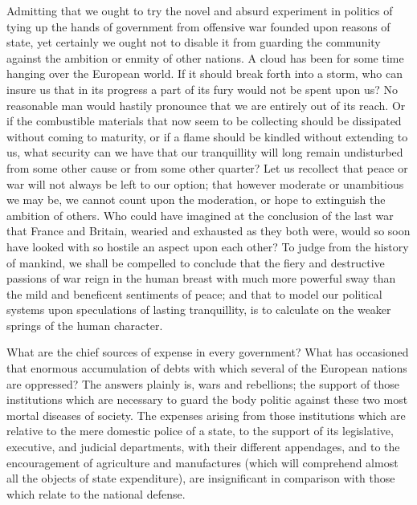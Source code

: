 Admitting that we ought to try the novel and absurd experiment in politics of tying up the hands of government from offensive war founded upon reasons of state, yet certainly we ought not to disable it from guarding the community against the ambition or enmity of other nations. A cloud has been for some time hanging over the European world. If it should break forth into a storm, who can insure us that in its progress a part of its fury would not be spent upon us? No reasonable man would hastily pronounce that we are entirely out of its reach. Or if the combustible materials that now seem to be collecting should be dissipated without coming to maturity, or if a flame should be kindled without extending to us, what security can we have that our tranquillity will long remain undisturbed from some other cause or from some other quarter? Let us recollect that peace or war will not always be left to our option; that however moderate or unambitious we may be, we cannot count upon the moderation, or hope to extinguish the ambition of others. Who could have imagined at the conclusion of the last war that France and Britain, wearied and exhausted as they both were, would so soon have looked with so hostile an aspect upon each other? To judge from the history of mankind, we shall be compelled to conclude that the fiery and destructive passions of war reign in the human breast with much more powerful sway than the mild and beneficent sentiments of peace; and that to model our political systems upon speculations of lasting tranquillity, is to calculate on the weaker springs of the human character.

What are the chief sources of expense in every government? What has occasioned that enormous accumulation of debts with which several of the European nations are oppressed? The answers plainly is, wars and rebellions; the support of those institutions which are necessary to guard the body politic against these two most mortal diseases of society. The expenses arising from those institutions which are relative to the mere domestic police of a state, to the support of its legislative, executive, and judicial departments, with their different appendages, and to the encouragement of agriculture and manufactures (which will comprehend almost all the objects of state expenditure), are insignificant in comparison with those which relate to the national defense.

